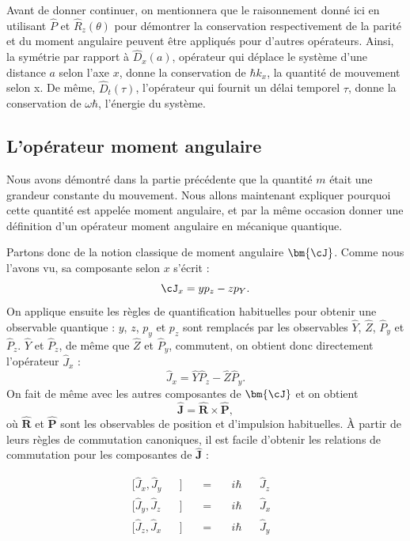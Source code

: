 Avant de donner continuer, on mentionnera que le raisonnement donné ici en utilisant $\hat{P}$ et $\hat{R}_z(\theta)$ pour démontrer la conservation respectivement de la parité et du moment angulaire peuvent être appliqués pour d'autres opérateurs. Ainsi, la symétrie par rapport à $\hat{D}_x(a)$, opérateur qui déplace le système d'une distance $a$ selon l'axe $x$, donne la conservation de $\hbar k_x$, la quantité de mouvement selon x. De même, $\hat{D}_t(\tau)$, l'opérateur qui fournit un délai temporel $\tau$, donne la conservation de $\omega \hbar$, l'énergie du système.

\subsection{L'opérateur moment angulaire}
Nous avons démontré dans la partie précédente que la quantité $m$ était une grandeur constante du mouvement. Nous allons maintenant expliquer pourquoi cette quantité est appelée moment angulaire, et par la même occasion donner une définition d'un opérateur moment angulaire en mécanique quantique.

Partons donc de la notion classique de moment angulaire $\bm{\cJ}$. Comme nous l'avons vu, sa composante selon $x$ s'écrit :
\begin{equation*}
\cJ_x=yp_z-zp_Y.
\end{equation*}
On applique ensuite les règles de quantification habituelles pour obtenir une observable quantique : $y$, $z$, $p_y$ et $p_z$ sont remplacés par les observables $\hat{Y}$, $\hat{Z}$, $\hat{P}_y$ et $\hat{P}_z$. $\hat{Y}$ et $\hat{P}_z$, de même que $\hat{Z}$ et $\hat{P}_y$, commutent, on obtient donc directement l'opérateur $\hat{J}_x$ :
\begin{equation*}
\hat{J}_x=\hat{Y}\hat{P}_z-\hat{Z}\hat{P}_y.
\end{equation*}
On fait de même avec les autres composantes de $\bm{\cJ}$ et on obtient 
\begin{equation*}
\bm{\hat{J}}=\bm{\hat{R}}\times\bm{\hat{P}},
\end{equation*}
où $\bm{\hat{R}}$ et $\bm{\hat{P}}$ sont les observables de position et d'impulsion habituelles. \`A partir de leurs règles de commutation canoniques, il est facile d'obtenir les relations de commutation pour les composantes de $\bm{\hat{J}}$ :

\begin{equation}
\begin{alignedat}{6}
&[\hat{J}_x,\hat{J}_y&&]~&&=~&&i\hbar &&\hat{J}_z&&\\
&[\hat{J}_y,\hat{J}_z&&]~&&=~&&i\hbar &&\hat{J}_x&&\\
&[\hat{J}_z,\hat{J}_x&&]~&&=~&&i\hbar &&\hat{J}_y&&
\end{alignedat}
\label{Eq.CommutJ}
\end{equation}

